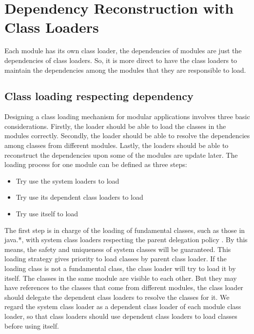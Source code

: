 \documentclass[conference]{IEEEtran}
\begin{document}
 
 
\section{Dependency Reconstruction with Class Loaders\label{sec:reconstructionCL}}

Each module has its own class loader, the dependencies of modules are just the dependencies of class loaders. 
So, it is more direct to have the class loaders to maintain the dependencies among the modules that they are responsible to load. 


\subsection{Class loading respecting dependency}

Designing a class loading mechanism for modular applications involves three basic considerations. Firstly, the loader should be able to load the classes in the modules correctly. Secondly, the loader should be able to resolve the dependencies among classes from different modules. Lastly, the loaders should be able to reconstruct the dependencies upon some of the modules are update later. 
The loading process for one module can be defined as three steps:
\begin{itemize}
\item Try use the system loaders to load
\item Try use its dependent class loaders to load
\item Try use itself to load
\end{itemize}

The first step is in charge of the loading of fundamental classes, such as those in java.*, with system class loaders respecting the parent delegation policy \cite{parent_delegation}. By this means, the safety and uniqueness of system classes will be guaranteed. This loading strategy gives priority to load classes by parent class loader. If the loading class is not a fundamental class, the class loader will try to load it by itself. The classes in the same module are visible to each other. But they may have references to the classes that come from different modules, the class loader should delegate the dependent class loaders to resolve the classes for it. We regard the system class loader as a dependent class loader of each module class loader, so that class loaders should use dependent class loaders to load classes before using itself.
\end{document}
